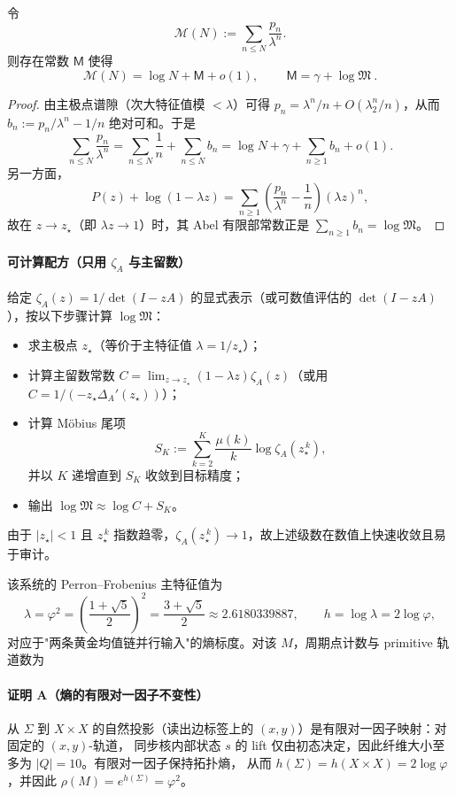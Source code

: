 \begin{corollary}\label{cor:abel-mertens-constant-universal}
令
\[
\mathcal{M}(N):=\sum_{n\le N}\frac{p_n}{\lambda^n}.
\]
则存在常数 $\mathsf{M}$ 使得
\[
\mathcal{M}(N)=\log N+\mathsf{M}+o(1),
\qquad
\boxed{\ \mathsf{M}=\gamma+\log\mathfrak{M}\ }.
\]
\end{corollary}

\begin{proof}
由主极点谱隙（次大特征值模 $<\lambda$）可得 $p_n=\lambda^n/n+O(\lambda_2^n/n)$，从而
\(
b_n:=p_n/\lambda^n-1/n
\)
绝对可和。于是
\[
\sum_{n\le N}\frac{p_n}{\lambda^n}
=\sum_{n\le N}\frac{1}{n}+\sum_{n\le N}b_n
=\log N+\gamma+\sum_{n\ge 1}b_n+o(1).
\]
另一方面，
\[
P(z)+\log(1-\lambda z)=\sum_{n\ge 1}\left(\frac{p_n}{\lambda^n}-\frac{1}{n}\right)(\lambda z)^n,
\]
故在 $z\to z_\star$（即 $\lambda z\to 1$）时，其 Abel 有限部常数正是 $\sum_{n\ge 1}b_n=\log\mathfrak{M}$。
\end{proof}

\paragraph{可计算配方（只用 $\zeta_A$ 与主留数）}
给定 $\zeta_A(z)=1/\det(I-zA)$ 的显式表示（或可数值评估的 $\det(I-zA)$），按以下步骤计算 $\log\mathfrak{M}$：
\begin{itemize}
  \item 求主极点 $z_\star$（等价于主特征值 $\lambda=1/z_\star$）；
  \item 计算主留数常数 $C=\lim_{z\to z_\star}(1-\lambda z)\zeta_A(z)$（或用 $C=1/(-z_\star\Delta_A'(z_\star))$）；
  \item 计算 Möbius 尾项
  \[
  S_K:=\sum_{k=2}^{K}\frac{\mu(k)}{k}\log\zeta_A(z_\star^{\,k}),
  \]
  并以 $K$ 递增直到 $S_K$ 收敛到目标精度；
  \item 输出
  \(
  \log\mathfrak{M}\approx \log C+S_K
  \)。
\end{itemize}
由于 $|z_\star|<1$ 且 $z_\star^{\,k}$ 指数趋零，$\zeta_A(z_\star^{\,k})\to 1$，故上述级数在数值上快速收敛且易于审计。

该系统的 Perron--Frobenius 主特征值为
\[
\lambda=\varphi^2=\left(\frac{1+\sqrt5}{2}\right)^2=\frac{3+\sqrt5}{2}\approx 2.6180339887,
\qquad
h=\log\lambda=2\log\varphi,
\]
对应于"两条黄金均值链并行输入"的熵标度。对该 $M$，周期点计数与 primitive 轨道数为

\paragraph{证明 A（熵的有限对一因子不变性）}
从 $\Sigma$ 到 $X\times X$ 的自然投影（读出边标签上的 $(x,y)$）是有限对一因子映射：对固定的 $(x,y)$-轨道，
同步核内部状态 $s$ 的 lift 仅由初态决定，因此纤维大小至多为 $|Q|=10$。有限对一因子保持拓扑熵，
从而 $h(\Sigma)=h(X\times X)=2\log\varphi$，并因此 $\rho(M)=e^{h(\Sigma)}=\varphi^2$。

